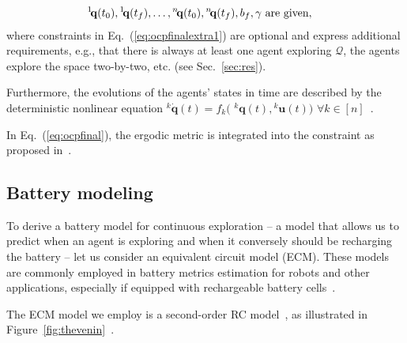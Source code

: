 \documentclass[lettersize,journal,twoside]{IEEEtran}
\theoremstyle{definition}
\begin{document}
\begin{subequations}
\begin{align}
  {}^1\hspace*{-.4ex}\mathbf{q}&(t_0),{}^1\hspace*{-.4ex}\mathbf{q}(t_f),\dots,{}^n\hspace*{-.4ex}\mathbf{q}(t_0),{}^n\hspace*{-.4ex}\mathbf{q}(t_f),b_f,\gamma\text{ are given},\label{eq:ocpgivenconst}
\end{align}\end{subequations}
where constraints in Eq.~(\ref{eq:ocpfinalextra1}) are optional and express additional requirements, e.g., that there is always at least one agent exploring $\mathcal{Q}$, the agents explore the space two-by-two, etc. (see Sec.~\ref{sec:res}).

Furthermore, the evolutions of the agents' states in time are described by the deterministic nonlinear equation ${}^k\dot{\mathbf{q}}(t)=f_k($ ${}^k\mathbf{q}(t),{}^k\mathbf{u}(t))$ $\forall k\in[n]$~\cite{abraham2018decentralized}.

In Eq.~(\ref{eq:ocpfinal}), the ergodic metric is integrated into the constraint as proposed in~\cite{dong2023time}. %

\subsection{Battery modeling}\label{sec:batt}
\noindent
To derive a battery model for continuous exploration -- a model that allows us to predict when an agent is exploring and when it conversely should be recharging the battery -- let us consider an equivalent circuit model (ECM). These models are commonly employed in battery metrics estimation for robots and other applications, especially if equipped with rechargeable battery cells~\cite{zhang2018online,xiaosong2012comparative,hasan2018exogenous,hinz2019comparison,mousavi2014various,seewald2022energy}.

The ECM model we employ is a second-order RC model~\cite{zhao2017observability}, as illustrated in Figure~\ref{fig:thevenin}~\cite{seewaldphdthesis}. 
\end{document}
